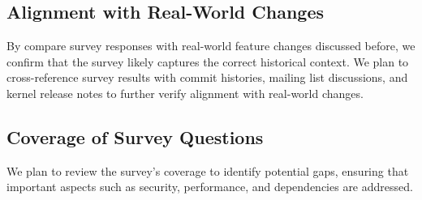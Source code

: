 \subsection{Alignment with Real-World Changes}

By compare survey responses with real-world feature changes discussed before, we confirm that the survey likely captures the correct historical context. We plan to cross-reference survey results with commit histories, mailing list discussions, and kernel release notes to further verify alignment with real-world changes.


\subsection{Coverage of Survey Questions}

We plan to review the survey’s coverage to identify potential gaps, ensuring that important aspects such as security, performance, and dependencies are addressed.


